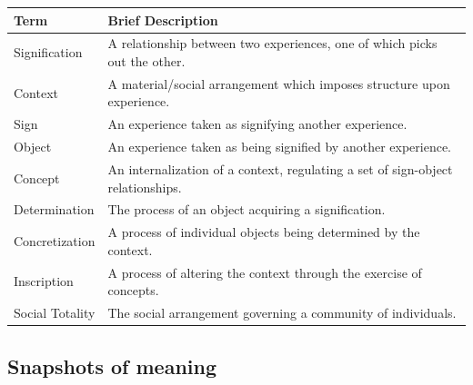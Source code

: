 \begin{table}[!ht]
\centering
\begin{tabular}{l|l}
\toprule
Term            & Brief Description \\
\midrule
Signification   & A relationship between two experiences, one of which picks out the other. \\
Context         & A material/social arrangement which imposes structure upon experience. \\
Sign            & An experience taken as signifying another experience. \\
Object          & An experience taken as being signified by another experience. \\
Concept         & An internalization of a context, regulating a set of sign-object relationships. \\
Determination   & The process of an object acquiring a signification. \\
Concretization  & A process of individual objects being determined by the context. \\
Inscription     & A process of altering the context through the exercise of concepts. \\
Social Totality  & The social arrangement governing a community of individuals. \\
\bottomrule
\end{tabular}
\end{table}

\subsection{Snapshots of meaning}\label{sec:theory:synchronics}

